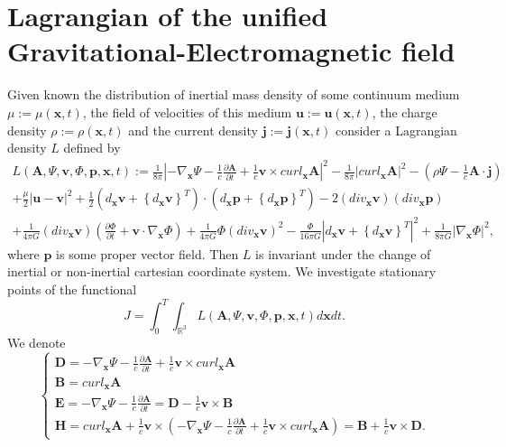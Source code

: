 \documentclass{article}
\theoremstyle{definition}
\theoremstyle{remark}
\renewcommand{\vec}[1]{\mathbf{#1}}
\begin{document}
\section{Lagrangian of the unified Gravitational-Electromagnetic field}\label{ghjfhgfdhd} Given known the distribution of inertial mass
density of some continuum medium $\mu:=\mu(\vec x,t)$, the field of
velocities of this medium $\vec u:=\vec u(\vec x,t)$, the charge
density $\rho:=\rho(\vec x,t)$ and the current density $\vec j:=\vec
j(\vec x,t)$ consider a Lagrangian density $L$ defined by
\begin{multline}\label{vhfffngghkjgghDD}
L\left(\vec A,\Psi,\vec v,\Phi,\vec p,\vec
x,t\right):=\frac{1}{8\pi}\left|-\nabla_{\vec
x}\Psi-\frac{1}{c}\frac{\partial\vec A}{\partial t}+\frac{1}{c}\vec
v\times curl_{\vec x}\vec A\right|^2-\frac{1}{8\pi}\left|curl_{\vec
x}\vec A\right|^2-\left(\rho\Psi-\frac{1}{c}\vec A\cdot\vec
j\right)\\+\frac{\mu}{2}\left|\vec u-\vec v\right|^2+
\frac{1}{2}\left(d_{\vec x}\vec v+\left\{d_{\vec x}\vec
v\right\}^T\right)\cdot\left(d_{\vec x}\vec p+\left\{d_{\vec x}\vec
p\right\}^T\right)-2\left(div_{\vec x}\vec v\right)\left(div_{\vec
x}\vec p\right)\\+\frac{1}{4\pi G}\left(div_{\vec x}\vec
v\right)\left(\frac{\partial \Phi}{\partial t}+\vec
v\cdot\nabla_{\vec x} \Phi\right)+\frac{1}{4\pi
G}\Phi\left(div_{\vec x}\vec v\right)^2-\frac{\Phi}{16\pi
G}\left|d_{\vec x}\vec v+\left\{d_{\vec x}\vec
v\right\}^T\right|^2+\frac{1}{8\pi G}\left|\nabla_{\vec
x}\Phi\right|^2,
\end{multline}
where $\vec p$ is some proper vector field. Then $L$ is invariant
under the change of inertial or non-inertial cartesian coordinate
system. We investigate stationary points of the functional
\begin{equation}\label{btfffygtgyggyDD}
J=\int_0^T\int_{\mathbb{R}^3}L\left(\vec A,\Psi,\vec v,\Phi,\vec
p,\vec x,t\right)d\vec x dt.
\end{equation}
We denote
\begin{equation}\label{guigjgjffghDD}
\begin{cases}
\vec D=-\nabla_{\vec x}\Psi-\frac{1}{c}\frac{\partial\vec
A}{\partial t}+\frac{1}{c}\vec
v\times curl_{\vec x}\vec A\\
\vec B=curl_{\vec x}\vec A
\\
\vec E=-\nabla_{\vec x}\Psi-\frac{1}{c}\frac{\partial\vec A}{\partial t}=\vec D-\frac{1}{c}\vec v\times\vec B\\
\vec H=curl_{\vec x}\vec A+\frac{1}{c}\vec
v\times\left(-\nabla_{\vec x}\Psi-\frac{1}{c}\frac{\partial\vec
A}{\partial t}+\frac{1}{c}\vec v\times curl_{\vec x}\vec
A\right)=\vec B+\frac{1}{c}\vec v\times\vec D.
\end{cases}
\end{equation}
\end{document}
